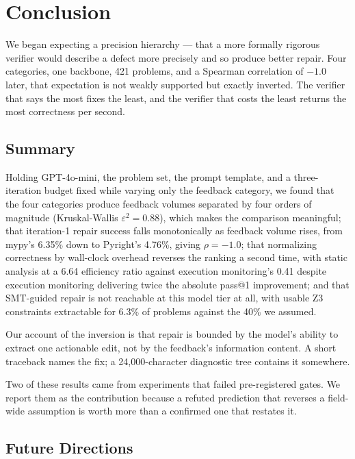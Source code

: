 \section{Conclusion}

We began expecting a precision hierarchy --- that a more formally rigorous verifier would describe a defect more precisely and so produce better repair. Four categories, one backbone, 421 problems, and a Spearman correlation of $-1.0$ later, that expectation is not weakly supported but exactly inverted. The verifier that says the most fixes the least, and the verifier that costs the least returns the most correctness per second.

\subsection{Summary}

Holding GPT-4o-mini, the problem set, the prompt template, and a three-iteration budget fixed while varying only the feedback category, we found that the four categories produce feedback volumes separated by four orders of magnitude (Kruskal-Wallis $\varepsilon^2 = 0.88$), which makes the comparison meaningful; that iteration-1 repair success falls monotonically as feedback volume rises, from mypy's 6.35\% down to Pyright's 4.76\%, giving $\rho = -1.0$; that normalizing correctness by wall-clock overhead reverses the ranking a second time, with static analysis at a 6.64 efficiency ratio against execution monitoring's 0.41 despite execution monitoring delivering twice the absolute pass@1 improvement; and that SMT-guided repair is not reachable at this model tier at all, with usable Z3 constraints extractable for 6.3\% of problems against the 40\% we assumed.

Our account of the inversion is that repair is bounded by the model's ability to extract one actionable edit, not by the feedback's information content. A short traceback names the fix; a 24,000-character diagnostic tree contains it somewhere.

Two of these results came from experiments that failed pre-registered gates. We report them as the contribution because a refuted prediction that reverses a field-wide assumption is worth more than a confirmed one that restates it.

\subsection{Future Directions}

